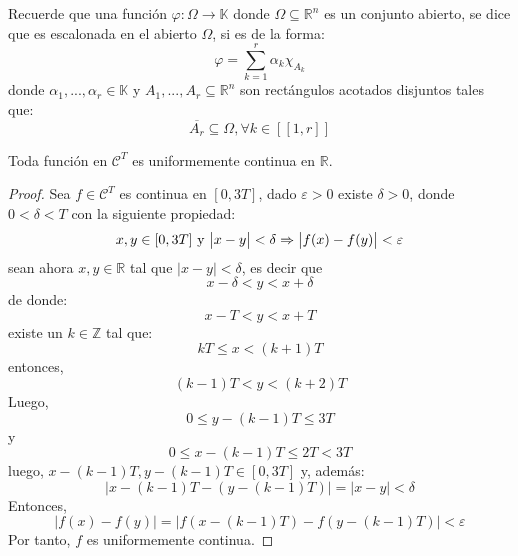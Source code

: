 \documentclass[12pt]{report}
\theoremstyle{largebreak}
\newcommand\cf[3]{\ensuremath{#1:#2\rightarrow#3}}
\newcommand\abs[1]{\ensuremath{\big|#1\big|}}
\newcommand{\natint}[1]{\ensuremath{[\![#1]\!]}}
\begin{document}
    \begin{obs}
        Recuerde que una función $\cf{\varphi}{\Omega}{\mathbb{K}}$ donde $\Omega\subseteq\mathbb{R}^n$ es un conjunto abierto, se dice que es escalonada en el abierto $\Omega$, si es de la forma:
        \begin{equation*}
            \varphi=\sum_{k=1}^r\alpha_k\chi_{A_k}
        \end{equation*}
        donde $\alpha_1,...,\alpha_r\in\mathbb{K}$ y $A_1,...,A_r\subseteq\mathbb{R}^n$ son rectángulos acotados disjuntos tales que:
        \begin{equation*}
            \overline{A_r}\subseteq\Omega,\forall k\in\natint{1,r}
        \end{equation*}
    \end{obs}

    \begin{lema}
        Toda función en $\mathcal{C}^T$ es uniformemente continua en $\mathbb{R}$.
    \end{lema}

    \begin{proof}
        Sea $f\in\mathcal{C}^T$ es continua en $[0,3T]$, dado $\varepsilon>0$ existe $\delta>0$, donde $0<\delta<T$ con la siguiente propiedad:
        \begin{equation*}
            x,y\in[0,3T]\textup{ y }\abs{x-y}<\delta\Rightarrow\abs{f(x)-f(y)}<\varepsilon
        \end{equation*}
        sean ahora $x,y\in\mathbb{R}$ tal que $\abs{x-y}<\delta$, es decir que
        \begin{equation*}
            x-\delta<y<x+\delta
        \end{equation*}
        de donde:
        \begin{equation*}
            x-T<y<x+T
        \end{equation*}
        existe un $k\in\mathbb{Z}$ tal que:
        \begin{equation*}
            kT\leq x<(k+1)T
        \end{equation*}
        entonces,
        \begin{equation*}
            (k-1)T<y<(k+2)T
        \end{equation*}
        Luego,
        \begin{equation*}
            0\leq y-(k-1)T\leq 3T
        \end{equation*}
        y
        \begin{equation*}
            0\leq x-(k-1)T\leq 2T<3T
        \end{equation*}
        luego, $x-(k-1)T,y-(k-1)T\in[0,3T]$ y, además:
        \begin{equation*}
            \abs{x-(k-1)T-(y-(k-1)T)}=\abs{x-y}<\delta
        \end{equation*}
        Entonces,
        \begin{equation*}
            \abs{f(x)-f(y)}=\abs{f(x-(k-1)T)-f(y-(k-1)T)}<\varepsilon
        \end{equation*}
        Por tanto, $f$ es uniformemente continua.
    \end{proof}
\end{document}
